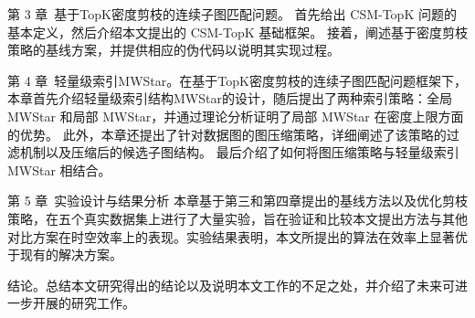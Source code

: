 第 3 章\ 基于TopK密度剪枝的连续子图匹配问题。
首先给出 CSM-TopK 问题的基本定义，然后介绍本文提出的 CSM-TopK 基础框架。
接着，阐述基于密度剪枝策略的基线方案，并提供相应的伪代码以说明其实现过程。

第 4 章\ 轻量级索引MWStar。在基于TopK密度剪枝的连续子图匹配问题框架下，本章首先介绍轻量级索引结构MWStar的设计，随后提出了两种索引策略：全局 MWStar 和局部 MWStar，并通过理论分析证明了局部 MWStar 在密度上限方面的优势。
此外，本章还提出了针对数据图的图压缩策略，详细阐述了该策略的过滤机制以及压缩后的候选子图结构。
最后介绍了如何将图压缩策略与轻量级索引 MWStar 相结合。

第 5 章\ 实验设计与结果分析
本章基于第三和第四章提出的基线方法以及优化剪枝策略，在五个真实数据集上进行了大量实验，旨在验证和比较本文提出方法与其他对比方案在时空效率上的表现。实验结果表明，本文所提出的算法在效率上显著优于现有的解决方案。

结论。总结本文研究得出的结论以及说明本文工作的不足之处，并介绍了未来可进一步开展的研究工作。

